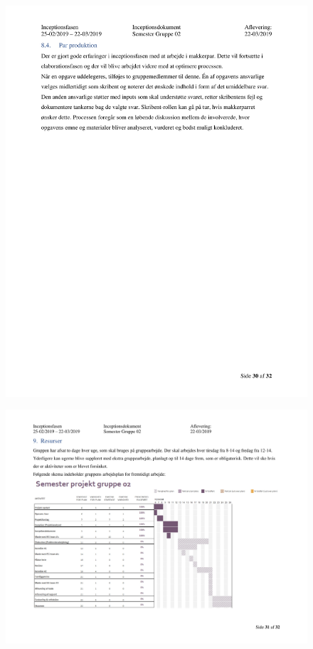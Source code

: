 \begin{figure}[hb]
  \includegraphics[scale = 0.33]{./PNG/Inceptions/Gruppe 02 + InceptionsDokument-31.jpg} 
\end{figure}

\begin{landscape}
\begin{figure}[hb]
  \includegraphics[scale = 0.33]{./PNG/Inceptions/Gruppe 02 + InceptionsDokument-32.jpg} 
\end{figure}
\end{landscape}


